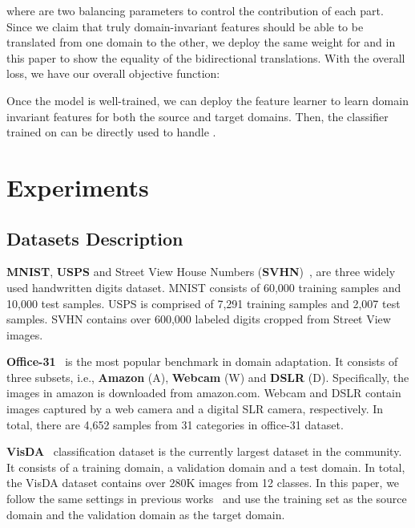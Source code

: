 \documentclass[sigconf]{acmart}
\begin{document}
where  are two balancing parameters to control the contribution of each part. Since we claim that truly domain-invariant features should be able to be translated from one domain to the other, we deploy the same weight for  and  in this paper to show the equality of the bidirectional translations. With the overall loss, we have our overall objective function:
 



Once the model is well-trained, we can deploy the feature learner  to learn domain invariant features for both the source and target domains. Then, the classifier trained on  can be directly used to handle .

\section{Experiments}


\subsection{Datasets Description}
{\bf MNIST}, {\bf USPS} and Street View House Numbers ({\bf SVHN})~\cite{netzer2011reading}, are three widely used handwritten digits dataset. MNIST consists of 60,000 training samples and 10,000 test samples. USPS is comprised of 7,291 training samples and 2,007 test samples. SVHN contains over 600,000 labeled digits cropped from Street View images. 


 {\bf Office-31}~\cite{saenko2010adapting} is the most popular benchmark in domain adaptation. It consists of three subsets, i.e., {\bf Amazon} (A), {\bf Webcam} (W) and {\bf DSLR} (D). Specifically, the images in amazon is downloaded from amazon.com. Webcam and DSLR contain images captured by a web camera and a digital SLR camera, respectively. In total, there are 4,652 samples from 31 categories in office-31 dataset. 



 {\bf VisDA}~\cite{visda2017} classification dataset is the currently largest dataset in the community. It consists of a training domain, a validation domain and a test domain. In total, the VisDA dataset contains over 280K images from 12 classes. In this paper, we follow the same settings in previous works~\cite{saito2018maximum,pinheiro2018unsupervised} and use the training set as the source domain and the validation domain as the target domain. 
\end{document}
